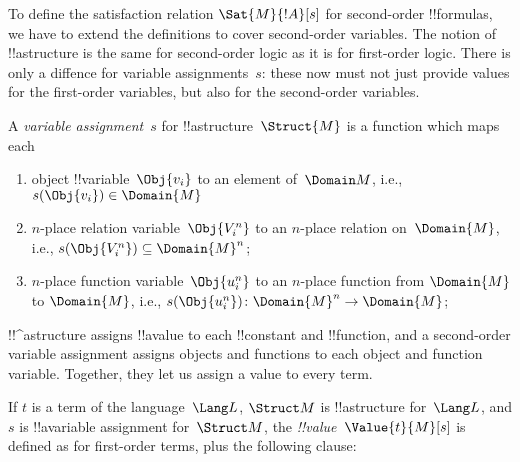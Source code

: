\documentclass[../../../include/open-logic-section]{subfiles}
\begin{document}


\begin{explain}
To define the satisfaction relation $\Sat{M}{!A}[s]$ for second-order
!!{formula}s, we have to extend the definitions to cover second-order
variables.  The notion of !!a{structure} is the same for second-order
logic as it is for first-order logic. There is only a diffence for
variable assignments~$s$: these now must not just provide values for
the first-order variables, but also for the second-order variables.
\end{explain}

\begin{defn}
A \emph{variable assignment}~$s$ for !!a{structure}~$\Struct{M}$ is a
function which maps each
\begin{enumerate}
\item object !!{variable}~$\Obj{v_i}$ to an element of~$\Domain M$,
  i.e., $s(\Obj{v_i}) \in \Domain{M}$
\item $n$-place relation variable~$\Obj{V_i^n}$ to an $n$-place
  relation on~$\Domain{M}$, i.e., $s(\Obj{V_i^n}) \subseteq \Domain{M}^n$;
\item $n$-place function variable~$\Obj{u_i^n}$ to an $n$-place
  function from $\Domain{M}$ to $\Domain{M}$, i.e.,
  $s(\Obj{u_i^n})\colon \Domain{M}^n \to \Domain{M}$;
\end{enumerate}
\end{defn}

\begin{explain}
!!^a{structure} assigns !!a{value} to each !!{constant} and
!!{function}, and a second-order variable assignment assigns objects and
functions to each object and function variable. Together, they let us
assign a value to every term.
\end{explain}

\begin{defn}
If $t$ is a term of the language~$\Lang L$, $\Struct M$ is
!!a{structure} for~$\Lang L$, and $s$ is !!a{variable} assignment
for~$\Struct M$, the \emph{!!{value}}~$\Value{t}{M}[s]$ is defined as
for first-order terms, plus the following clause:
\begin{quote}
\end{quote}
\end{defn}
\end{document}
